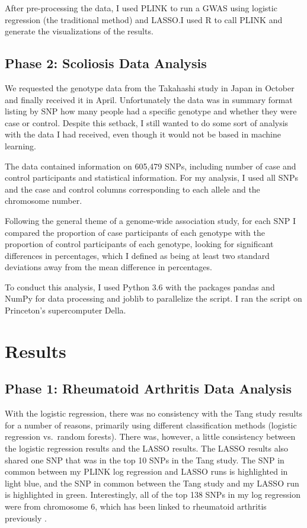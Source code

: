 \documentclass[12pt]{report}
\begin{document}
After pre-processing the data, I used PLINK to run a GWAS using logistic
regression (the traditional method) and LASSO.\@ I used R\cite{RCoreTeam2016} to
call PLINK and generate the visualizations of the results.

\section{Phase 2: Scoliosis Data Analysis}
We requested the genotype data from the Takahashi study in Japan in October and
finally received it in April. Unfortunately the data was in summary format listing
by SNP how many people had a specific genotype and whether they were case or control.
Despite this setback, I still wanted to do some sort of analysis with the data I
had received, even though it would not be based in machine learning.

The data contained information on 605,479 SNPs, including number of case and 
control participants and statistical information. For my analysis, I used all SNPs
and the case and control columns corresponding to each allele and the chromosome
number.

Following the general theme of a genome-wide association study, for each SNP I 
compared the proportion of case participants of each genotype with the proportion
of control participants of each genotype, looking for significant differences in 
percentages, which I defined as being at least two standard deviations away from
the mean difference in percentages.

To conduct this analysis, I used Python 3.6 with the packages pandas\cite{pandas}
and NumPy\cite{numpy} for data processing and joblib to parallelize the script. I ran
the script on Princeton's supercomputer Della.


\chapter{Results}
\section{Phase 1: Rheumatoid Arthritis Data Analysis}
With the logistic regression, there was no consistency with the Tang study
results for a number of reasons, primarily using different classification
methods (logistic regression vs.\ random forests). There was, however, a little
consistency between the logistic regression results and the LASSO results. The
LASSO results also shared one SNP that was in the top 10 SNPs in the Tang study.
The SNP in common between my PLINK log regression and LASSO runs is highlighted
in light blue, and the SNP in common between the Tang study and my LASSO run is
highlighted in green. Interestingly, all of the top 138 SNPs in my log regression
were from chromosome 6, which has been linked to rheumatoid arthritis previously
\cite{RAgene_manchester}\cite{RA_haplotypes}.
\end{document}
